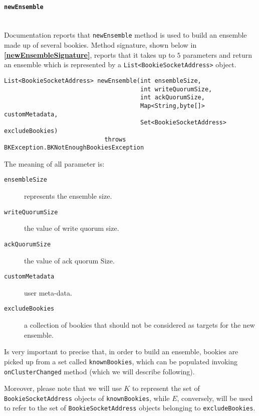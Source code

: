 \documentclass[sigconf]{acmart}
\begin{document}
\paragraph{\texttt{newEnsemble}}
\hfill\\
Documentation \citep{EnsemblePlacementPolicy} reports that \texttt{newEnsemble} method is used to build an ensemble made up of several bookies. Method signature, shown below in \textbf{\cref{newEnsembleSignature}}, reports that it takes up to $5$ parameters and return an ensemble which is represented by a \texttt{List<BookieSocket\-Address>} object. 

\begin{lstlisting}[frame=lines,basicstyle=\ttfamily\tiny, caption={Signature of method \texttt{newEnsemble}}, label={newEnsembleSignature}]
List<BookieSocketAddress> newEnsemble(int ensembleSize,
                                      int writeQuorumSize,
                                      int ackQuorumSize,
                                      Map<String,byte[]> customMetadata,
                                      Set<BookieSocketAddress> excludeBookies)
                            throws BKException.BKNotEnoughBookiesException
\end{lstlisting}

The meaning of all parameter is:

\begin{description}
\item[\texttt{ensembleSize}] represents the ensemble size.
\item[\texttt{writeQuorumSize}] the value of write quorum size.
\item[\texttt{ackQuorumSize}] the value of ack quorum Size.
\item[\texttt{customMetadata}] user meta-data.
\item[\texttt{excludeBookies}] a collection of bookies that should not be considered as targets for the new ensemble.
\end{description}

Is very important to precise that, in order to build an ensemble, bookies are picked up from a set called \texttt{knownBookies}, which can be populated invoking \texttt{onClusterChanged} method (which we will describe following).

Moreover, please note that we will use $K$ to represent the set of \texttt{BookieSocketAddress} objects of \texttt{knownBookies}, while $E$, conversely, will be used to refer to the set of \texttt{BookieSocketAddress} objects belonging to \texttt{excludeBookies}.
\end{document}
